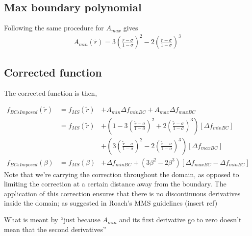 
\subsection{Max boundary polynomial}
Following the same procedure for $A_{max}$ gives 
\begin{align*}
    A_{min} (\widetilde{r}) = 3 \left(  \frac{\widetilde{r} - \sigma }{ 1 - \sigma}\right)^2 -
    2 \left( \frac{\widetilde{r} - \sigma}{1 - \sigma} \right)^3
\end{align*}
\subsection{Corrected function} 

The corrected function is then, 

\begin{align*}
    f_{BCsImposed} (\widetilde{r}) &= 
    f_{MS}(\widetilde{r}) &+ A_{min} \Delta f_{minBC} + A_{max} \Delta f_{maxBC} \\
                                   &= 
    f_{MS}(\widetilde{r}) &+
    \left(
        1 - 3 \left(  \frac{\widetilde{r} - \sigma }{ 1 - \sigma}\right)^2 +
    2 \left( \frac{\widetilde{r} - \sigma}{1 - \sigma} \right)^3 
\right)
    \left[ \Delta f_{minBC} \right]\\ 
           & &+
    \left(
         3 \left(  \frac{\widetilde{r} - \sigma }{ 1 - \sigma}\right)^2- 
    2 \left( \frac{\widetilde{r} - \sigma}{1 - \sigma} \right)^3 
\right)
    \left[ \Delta f_{maxBC} \right] \\ 
              f_{BCsImposed} (\beta) &= f_{MS}(\beta) &+ \Delta f_{minBC} + \left(  3 \beta^2 - 2 \beta^3  \right)
    \left[  \Delta f_{maxBC} - \Delta f_{minBC} \right]
\end{align*}
Note that we're carrying the correction throughout the domain, as opposed to 
limiting the correction at a certain distance away from the boundary. The 
application of this correction ensures that there is no discontinuous derivatives
inside the domain; as suggested in Roach's MMS guidelines (insert ref) 


What is meant by ``just because $A_{min}$ and its first derivative go to zero
doesn't mean that the second derivatives''


